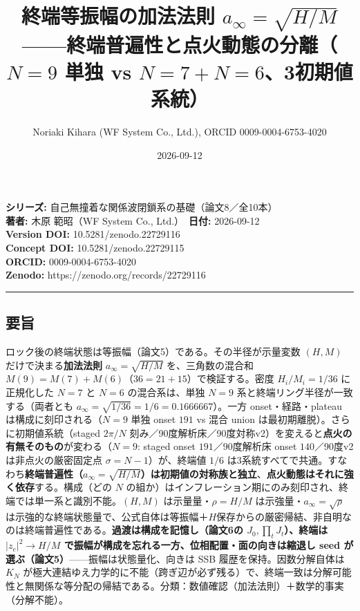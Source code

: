 \documentclass[
  a4paper,
]{ltjsarticle}
\title{終端等振幅の加法法則
\(a_\infty=\sqrt{H/M}\)------終端普遍性と点火動態の分離（\(N=9\) 単独 vs
\(N=7+N=6\)、3初期値系統）}
\author{Noriaki Kihara (WF System Co., Ltd.), ORCID 0009-0004-6753-4020}
\date{2026-09-12}
\begin{document}
\maketitle

\textbf{シリーズ:} 自己無撞着な関係波閉鎖系の基礎（論文8／全10本）\\
\textbf{著者:} 木原 範昭（WF System Co., Ltd.）　\textbf{日付:}
2026-09-12\\
\textbf{Version DOI:} 10.5281/zenodo.22729116\\
\textbf{Concept DOI:} 10.5281/zenodo.22729115\\
\textbf{ORCID:} 0009-0004-6753-4020\\
\textbf{Zenodo:} https://zenodo.org/records/22729116\\

\begin{center}\rule{0.5\linewidth}{0.5pt}\end{center}

\subsection{要旨}\label{ux8981ux65e8}

ロック後の終端状態は等振幅（論文5）である。その半径が示量変数 \((H,M)\)
だけで決まる\textbf{加法法則} \(a_\infty=\sqrt{H/M}\) を、三角数の混合和
\(M(9)=M(7)+M(6)\)（\(36=21+15\)）で検証する。密度 \(H_i/M_i=1/36\)
に正規化した \(N=7\) と \(N=6\) の混合系は、単独 \(N=9\)
系と終端リング半径が一致する（両者とも
\(a_\infty=\sqrt{1/36}=1/6=0.1666667\)）。一方 onset・経路・plateau
は構成に刻印される（\(N=9\) 単独 onset \(191\) vs 混合 union
は最初期離脱）。さらに初期値系統（staged \(2\pi/N\)
刻み／90度解析床／90度対称v2）を変えると\textbf{点火の有無そのもの}が変わる（\(N=9\):
staged onset \(191\)／90度解析床 onset \(140\)／90度v2
は非点火の厳密固定点 \(\sigma=N-1\)）が、終端値 \(1/6\)
は3系統すべてで共通。すなわち\textbf{終端普遍性（\(a_\infty=\sqrt{H/M}\)）は初期値の対称族と独立}、\textbf{点火動態はそれに強く依存}する。構成（どの
\(N\)
の組か）はインフレーション期にのみ刻印され、終端では単一系と識別不能。\((H,M)\)
は示量量・\(\rho=H/M\) は示強量・\(a_\infty=\sqrt\rho\)
は示強的な終端状態量で、公式自体は等振幅＋\(H\)保存からの厳密帰結、非自明なのは終端普遍性である。\textbf{過渡は構成を記憶し（論文6の
\(J_0,\prod_tJ_t\)）、終端は \(|z_e|^2\to H/M\)
で振幅が構成を忘れる一方、位相配置・面の向きは縮退し seed
が選ぶ（論文5）}------振幅は状態量化、向きは SSB
履歴を保持。因数分解自体は \(K_N\)
が極大連結ゆえ力学的に不能（跨ぎ辺が必ず残る）で、終端一致は分解可能性と無関係な等分配の帰結である。分類：数値確認（加法法則）＋数学的事実（分解不能）。
\end{document}

